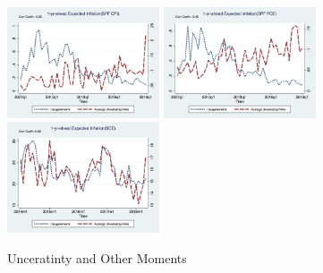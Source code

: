 \documentclass[]{article}
\begin{document}
\begin{figure}[ht]
		\smallskip	
		\includegraphics[width=4.5cm]{figures/CPI_disg_varSPFCPIQ.png}
		\includegraphics[width=4.5cm]{figures/PCE_disg_varSPFPCEQ.png}
		\includegraphics[width=4.5cm]{figures/Q9_disg_varSCEM.png}\\
		\caption{Unceratinty and Other Moments}
		\label{UnceratitnyOtherMoments}
	\end{figure}
	
\end{document}
